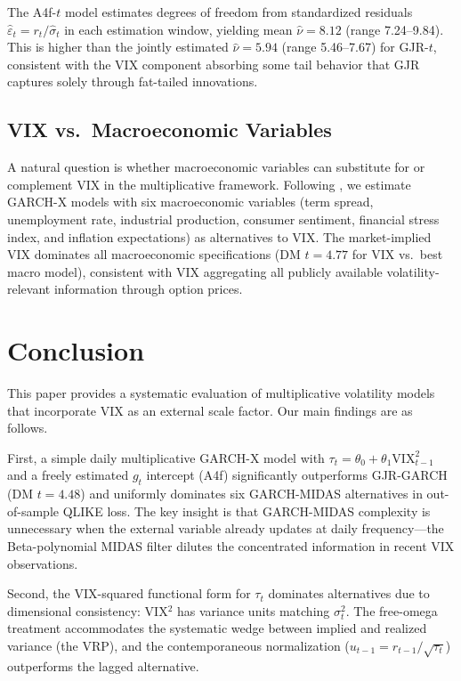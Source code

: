 \documentclass[12pt,a4paper]{article}
\begin{document}
The A4f-$t$ model estimates degrees of freedom from standardized residuals $\hat\varepsilon_t = r_t / \hat\sigma_t$ in each estimation window, yielding mean $\hat\nu = 8.12$ (range 7.24--9.84). This is higher than the jointly estimated $\hat\nu = 5.94$ (range 5.46--7.67) for GJR-$t$, consistent with the VIX component absorbing some tail behavior that GJR captures solely through fat-tailed innovations.

\subsection{VIX vs.\ Macroeconomic Variables}

A natural question is whether macroeconomic variables can substitute for or complement VIX in the multiplicative framework. Following \citet{conrad2015}, we estimate GARCH-X models with six macroeconomic variables (term spread, unemployment rate, industrial production, consumer sentiment, financial stress index, and inflation expectations) as alternatives to VIX. The market-implied VIX dominates all macroeconomic specifications (DM $t = 4.77$ for VIX vs.\ best macro model), consistent with VIX aggregating all publicly available volatility-relevant information through option prices.


\section{Conclusion}
\label{sec:conclusion}

This paper provides a systematic evaluation of multiplicative volatility models that incorporate VIX as an external scale factor. Our main findings are as follows.

First, a simple daily multiplicative GARCH-X model with $\tau_t = \theta_0 + \theta_1 \mathrm{VIX}_{t-1}^2$ and a freely estimated $g_t$ intercept (A4f) significantly outperforms GJR-GARCH (DM $t = 4.48$) and uniformly dominates six GARCH-MIDAS alternatives in out-of-sample QLIKE loss. The key insight is that GARCH-MIDAS complexity is unnecessary when the external variable already updates at daily frequency---the Beta-polynomial MIDAS filter dilutes the concentrated information in recent VIX observations.

Second, the VIX-squared functional form for $\tau_t$ dominates alternatives due to dimensional consistency: VIX$^2$ has variance units matching $\sigma_t^2$. The free-omega treatment accommodates the systematic wedge between implied and realized variance (the VRP), and the contemporaneous normalization ($u_{t-1} = r_{t-1}/\sqrt{\tau_t}$) outperforms the lagged alternative.
\end{document}
